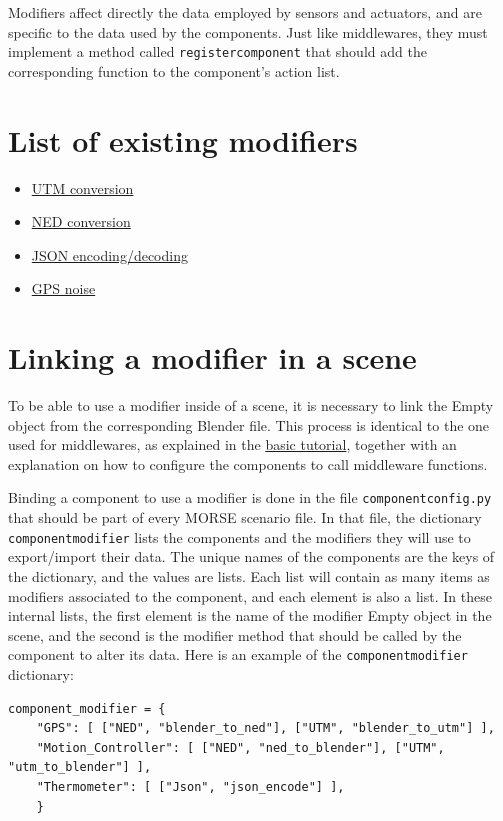 \documentclass[twoside,a4paper,10pt]{report}
\newcommand{\dokutitleleveltwo}[1]{\section{#1}}
\newcommand{\dokumonospace}[1]{\texttt{#1}}
\newcommand{\dokuitem}{\item}
\begin{document}
Modifiers affect directly the data employed by sensors and actuators, and are specific to the data used by the components. Just like middlewares, they must implement a method called \dokumonospace{register{\textunderscore}component} that should add the corresponding function to the component's action list.


\dokutitleleveltwo{List of existing modifiers}
\label{e1bd7dc12fc91796f6afa908960bddfd}%

\begin{itemize}
\dokuitem  \hyperref[b32d6491ce03dd4e6c877f3bfd9ff07e]{ UTM conversion}
\dokuitem  \hyperref[f68daad189b2fffd0b8cab5e36ec9d96]{ NED conversion}
\dokuitem  \hyperref[466deec76ecdf5fca6d38571f6324d54]{ JSON encoding/decoding}
\dokuitem  \hyperref[aa061f2a51a69b41bf030cab71d64ed9]{ GPS noise}
\end{itemize}

\dokutitleleveltwo{Linking a modifier in a scene}
\label{840a8bd36b58f7e792398436a4be45db}%

To be able to use a modifier inside of a scene, it is necessary to link the Empty object from the corresponding Blender file. This process is identical to the one used for middlewares, as explained in the \hyperref[0575c8d592fb7b088226750aceec2b4e]{ basic tutorial}, together with an explanation on how to configure the components to call middleware functions.

Binding a component to use a modifier is done in the file \dokumonospace{component{\textunderscore}config.py} that should be part of every MORSE scenario file. In that file, the dictionary \dokumonospace{component{\textunderscore}modifier} lists the components and the modifiers they will use to export/import their data. The unique names of the components are the keys of the dictionary, and the values are lists. Each list will contain as many items as modifiers associated to the component, and each element is also a list. In these internal lists, the first element is the name of the modifier Empty object in the scene, and the second is the modifier method that should be called by the component to alter its data. Here is an example of the \dokumonospace{component{\textunderscore}modifier} dictionary:


\lstset{language=python}
\begin{lstlisting}
component_modifier = {
	"GPS": [ ["NED", "blender_to_ned"], ["UTM", "blender_to_utm"] ],
	"Motion_Controller": [ ["NED", "ned_to_blender"], ["UTM", "utm_to_blender"] ],
	"Thermometer": [ ["Json", "json_encode"] ],
	}

\end{lstlisting}
\end{document}
